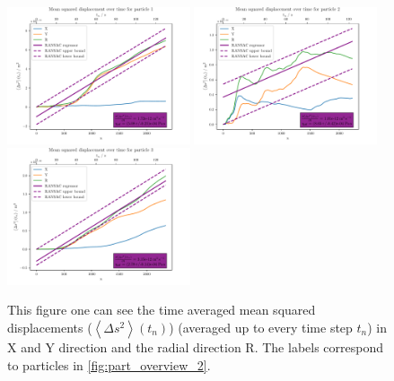 \documentclass[12pt,english,ngerman]{scrartcl}
\begin{document}
\begin{figure}[H]
	\centering
	\includegraphics[width=0.48\textwidth]{figures/I2_particle_1.pdf}
	\includegraphics[width=0.48\textwidth]{figures/I2_particle_2.pdf}
	\includegraphics[width=0.48\textwidth]{figures/I2_particle_3.pdf}
	\caption[Time averaged mean squared displacements from the particles of the second
		capture]{This figure one can see the time averaged mean squared displacements
		($\left\langle \Delta s^2 \right\rangle(t_n)$) (averaged up to every time step
		$t_n$) in X and Y direction and the radial direction R. The labels correspond
		to particles in \autoref{fig:part_overview_2}.
	}\label{fig:part_second}
\end{figure}
\end{document}
